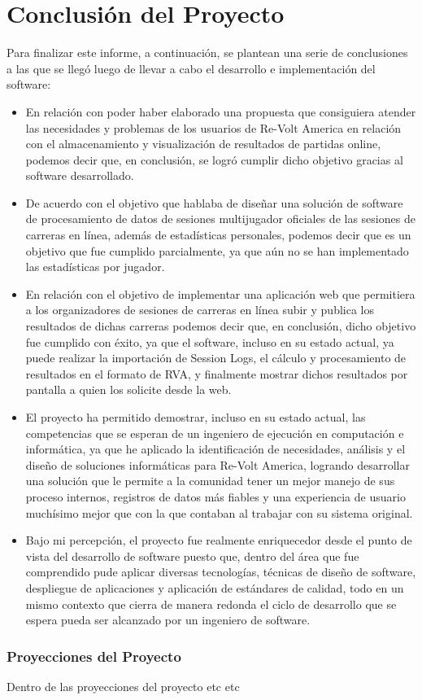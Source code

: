 \chapter{Conclusión del Proyecto}
Para finalizar este informe, a continuación, se plantean una serie de conclusiones a las que se llegó luego de llevar a cabo el desarrollo e implementación del software:

\begin{itemize}
	\item En relación con poder haber elaborado una propuesta que consiguiera atender las necesidades y problemas de los usuarios de Re-Volt America en relación con el almacenamiento y visualización de resultados de partidas online, podemos decir que, en conclusión, se logró cumplir dicho objetivo gracias al software desarrollado.
	\item De acuerdo con el objetivo que hablaba de diseñar una solución de software de procesamiento de datos de sesiones multijugador oficiales de las sesiones de carreras en línea, además de estadísticas personales, podemos decir que es un objetivo que fue cumplido parcialmente, ya que aún no se han implementado las estadísticas por jugador.
	\item En relación con el objetivo de implementar una aplicación web que permitiera a los organizadores de sesiones de carreras en línea subir y publica los resultados de dichas carreras podemos decir que, en conclusión, dicho objetivo fue cumplido con éxito, ya que el software, incluso en su estado actual, ya puede realizar la importación de Session Logs, el cálculo y procesamiento de resultados en el formato de RVA, y finalmente mostrar dichos resultados por pantalla a quien los solicite desde la web.
	\item El proyecto ha permitido demostrar, incluso en su estado actual, las competencias que se esperan de un ingeniero de ejecución en computación e informática, ya que he aplicado la identificación de necesidades, análisis y el diseño de soluciones informáticas para Re-Volt America, logrando desarrollar una solución que le permite a la comunidad tener un mejor manejo de sus proceso internos, registros de datos más fiables y una experiencia de usuario muchísimo mejor que con la que contaban al trabajar con su sistema original. 
	\item Bajo mi percepción, el proyecto fue realmente enriquecedor desde el punto de vista del desarrollo de software puesto que, dentro del área que fue comprendido pude aplicar diversas tecnologías, técnicas de diseño de software, despliegue de aplicaciones y aplicación de estándares de calidad, todo en un mismo contexto que cierra de manera redonda el ciclo de desarrollo que se espera pueda ser alcanzado por un ingeniero de software.
\end{itemize}

\subsection{Proyecciones del Proyecto}
Dentro de las proyecciones del proyecto etc etc
